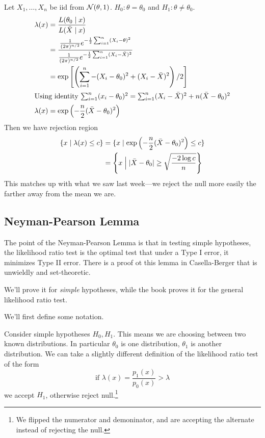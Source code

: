 \begin{example}
    Let $X_1, \dots, X_n$ be iid from $\mathcal N(\theta, 1)$. $H_0: \theta = \theta_0$ and $H_1 : \theta\neq \theta_0$.
    \begin{align*}
        \lambda(x) & = \frac{L(\theta_0 \mid x)}{L(\bar{X}\mid x)}                                                                                                    \\
                   & = \frac{\frac{1}{(2\pi)^{n/2}}e^{-\frac{1}{2}\sum^n_{i=1}(X_i - \theta)^2}}{\frac{1}{(2\pi)^{n/2}}e^{-\frac{1}{2}\sum^n_{i=1}(X_i - \bar{X})^2}} \\
                   & = \exp\left[ \left(\sum^n_{i=1} -(X_i - \theta_0)^2 + (X_i - \bar{X})^2 \right)/2 \right]                                                        \\
        \intertext{Using identity $\sum^n_{i=1} (x_i - \theta_0)^2 = \sum^n_{i=1}(X_i - \bar{X})^2 + n(\bar{X} - \theta_0)^2$}
        \lambda(x) & = \exp\left( -\frac{n}{2}(\bar{X} - \theta_0)^2 \right)
    \end{align*}
    Then we have rejection region
    \begin{align*}
        \{x\mid\lambda(x)\leq c\} & =  \{x\mid \exp\left( -\frac{n}{2}(\bar{X} - \theta_0)^2 \right) \leq c\}        \\
                                  & = \left\{x\Bigm\vert |\bar{X} - \theta_0| \geq \sqrt{\frac{-2\log c}{n}}\right\}
    \end{align*}
    This matches up with what we saw last week---we reject the null more easily the farther away from the mean we are.
\end{example}

\subsection{Neyman-Pearson Lemma}


The point of the Neyman-Pearson Lemma is that in testing simple hypotheses, the likelihood ratio test is the optimal test that under a Type I error, it minimizes Type II error. There is a proof ot this lemma in Casella-Berger that is unwieldly and set-theoretic.

We'll prove it for \emph{simple} hypotheses, while the book proves it for the general likelihood ratio test.

We'll first define some notation.

Consider simple hypotheses $H_0, H_1$. This means we are choosing between two known distributions. In particular $\theta_0$ is one distribution, $\theta_1$ is another distribution. We can take a slightly different definition of the likelihood ratio test of the form
\[\text{if }\lambda(x) = \frac{p_1(x)}{p_0(x)} > \lambda\]
we accept $H_1$, otherwise reject null.\footnote{We flipped the numerator and demoninator, and are accepting the alternate instead of rejecting the null.}

